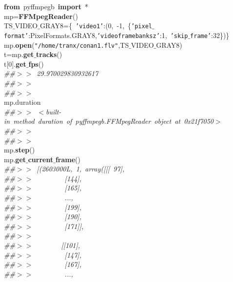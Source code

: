 \noindent
\mbox{}\textbf{from}\ pyffmpegb\ \textbf{import}\ * \\
\mbox{}mp=\textbf{FFMpegReader}() \\
\mbox{}TS$\_$VIDEO$\_$GRAY8=\{\ \texttt{'video1'}:(0,\ -1,\ \{\texttt{'pixel$\_$format'}:PixelFormats.GRAY8,\texttt{'videoframebanksz'}:1,\ \texttt{'skip$\_$frame'}:32\})\} \\
\mbox{}mp.\textbf{open}(\texttt{"{}/home/tranx/conan1.flv"{}},TS$\_$VIDEO$\_$GRAY8) \\
\mbox{}t=mp.\textbf{get$\_$tracks}() \\
\mbox{}t[0].\textbf{get$\_$fps}() \\
\mbox{}\textit{\#\#$>$$>$\ 29.970029830932617} \\
\mbox{}\textit{\#\#$>$$>$\ } \\
\mbox{}\textit{\#\#$>$$>$\ } \\
\mbox{}mp.duration \\
\mbox{}\textit{\#\#$>$$>$\ $<$built-in\ method\ duration\ of\ pyffmpegb.FFMpegReader\ object\ at\ 0x21f7050$>$} \\
\mbox{}\textit{\#\#$>$$>$\ } \\
\mbox{}\textit{\#\#$>$$>$\ } \\
\mbox{}mp.\textbf{step}() \\
\mbox{}mp.\textbf{get$\_$current$\_$frame}() \\
\mbox{}\textit{\#\#$>$$>$\ [(2603000L,\ 1,\ array([[[\ 97],} \\
\mbox{}\textit{\#\#$>$$>$\ \ \ \ \ \ \ \ \ [144],} \\
\mbox{}\textit{\#\#$>$$>$\ \ \ \ \ \ \ \ \ [165],} \\
\mbox{}\textit{\#\#$>$$>$\ \ \ \ \ \ \ \ \ ...,\ } \\
\mbox{}\textit{\#\#$>$$>$\ \ \ \ \ \ \ \ \ [199],} \\
\mbox{}\textit{\#\#$>$$>$\ \ \ \ \ \ \ \ \ [190],} \\
\mbox{}\textit{\#\#$>$$>$\ \ \ \ \ \ \ \ \ [171]],} \\
\mbox{}\textit{\#\#$>$$>$\ } \\
\mbox{}\textit{\#\#$>$$>$\ \ \ \ \ \ \ \ [[101],} \\
\mbox{}\textit{\#\#$>$$>$\ \ \ \ \ \ \ \ \ [147],} \\
\mbox{}\textit{\#\#$>$$>$\ \ \ \ \ \ \ \ \ [167],} \\
\mbox{}\textit{\#\#$>$$>$\ \ \ \ \ \ \ \ \ ...,\ } \\
